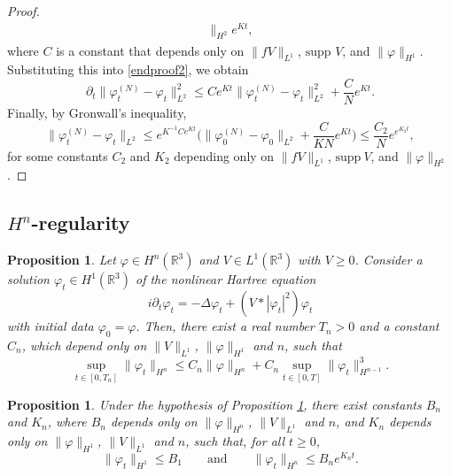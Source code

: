 \documentclass[11pt,a4paper]{scrartcl}
\newtheorem{prp}[thm]{Proposition}
\newcommand{\R}{\mathds{R}}
\begin{document}
\begin{proof}
\begin{align*}
    \|_{H^2} e^{Kt},
  \end{align*}
  where $C$ is a constant that depends only on $\| fV \|_{L^1}$, $\text{supp
  }V$, and $\| \varphi \|_{H^1}$. Substituting this into \eqref{endproof2}, we
  obtain
  \[
    \partial_t \| \varphi_t^{(N)} - \varphi_t \|_{L^2}^2 \le C e^{Kt} \|
    \varphi_t^{(N)} - \varphi_t \|_{L^2}^2 + \frac{C}{N} e^{Kt}.
  \]
  Finally, by Gronwall's inequality,
  \[
    \| \varphi_t^{(N)} - \varphi_t \|_{L^2} \le e^{K^{-1} C e^{Kt}} \Big( \|
    \varphi_0^{(N)} - \varphi_0 \|_{L^2} + \frac{C}{KN} e^{Kt} \Big) \le
    \frac{C_2}{N} e^{e^{K_2 t}},
  \]
  for some constants $C_2$ and $K_2$ depending only on $\| fV \|_{L^1}$,
  $\text{supp} \ V$, and $\| \varphi \|_{H^2}$.
\end{proof}


\subsection{$H^n$-regularity}


\begin{prp} \label{p:lregn}
  Let $\varphi \in H^n(\R^3)$ and $V \in L^1(\R^3)$ with $V \ge 0$. Consider a
  solution $\varphi_t \in H^1(\R^3)$ of the nonlinear Hartree equation
  \[
    i \partial_t \varphi_t = - \Delta \varphi_t + (V * |\varphi_t|^2)
    \varphi_t
  \]
  with initial data $\varphi_0 = \varphi$. Then, there exist a real number
  $T_n > 0$ and a constant $C_n$, which depend only on $\| V \|_{L^1}$, $\|
  \varphi \|_{H^1}$ and $n$, such that
  \[
    \sup_{t \in [0,T_n]} \| \varphi_t \|_{H^n} \le C_n \| \varphi \|_{H^n} +
    C_n \sup_{t \in [0,T]} \| \varphi_t \|_{H^{n-1}}^3.
  \]
\end{prp}


\begin{prp} \label{p:regn}
  Under the hypothesis of Proposition \ref{p:lregn}, there exist constants
  $B_n$ and $K_n$, where $B_n$ depends only on $\| \varphi \|_{H^n}$, $\| V
  \|_{L^1}$ and $n$, and $K_n$ depends only on $\| \varphi \|_{H^1}$, $\| V
  \|_{L^1}$ and $n$, such that, for all $t \ge 0$,
  \[
    \| \varphi_t \|_{H^1} \le B_1 \qquad \text{and} \qquad \| \varphi_t
    \|_{H^n} \le B_n e^{K_n t}.
  \]
\end{prp}
\end{document}
